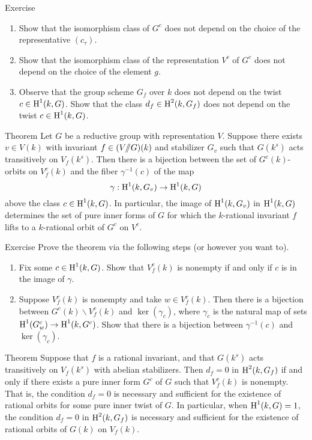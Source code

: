 \begin{enonce*}[remark]{Exercise}
\begin{enumerate}
  \item Show that the isomorphism class of $G^c$ does not depend on the choice 
    of the representative $(c_\tau)$. 
  \item Show that the isomorphism class of the representation $V^c$ of $G^c$ 
    does not depend on the choice of the element $g$. 
  \item Observe that the group scheme $G_f$ over $k$ does not depend on the 
    twist $c\in \operatorname{H}^1(k,G)$. Show that the class $d_f\in \operatorname{H}^2(k,G_f)$ does not 
    depend on the twist $c\in \operatorname{H}^1(k,G)$. 
\end{enumerate}
\end{enonce*}

\begin{enonce*}{Theorem}
Let $G$ be a reductive group with representation $V$. Suppose there exists 
$v\in V(k)$ with invariant $f\in (V/\!\!/ G)(k)$ and stabilizer $G_v$ such that 
$G(k^s)$ acts transitively on $V_f(k^s)$. Then there is a bijection between the 
set of $G^c(k)$-orbits on $V_f^c(k)$ and the fiber $\gamma^{-1}(c)$ of the map 
\[
  \gamma:\operatorname{H}^1(k,G_v) \to \operatorname{H}^1(k,G) 
\]
above the class $c\in \operatorname{H}^1(k,G)$. In particular, the image of $\operatorname{H}^1(k,G_v)$ in 
$\operatorname{H}^1(k,G)$ determines the set of pure inner forms of $G$ for which the 
$k$-rational invariant $f$ lifts to a $k$-rational orbit of $G^c$ on $V^c$. 
\end{enonce*}

\begin{enonce*}[remark]{Exercise}
Prove the theorem via the following steps (or however you want to). 
\begin{enumerate}
  \item Fix some $c\in \operatorname{H}^1(k,G)$. Show that $V_f^c(k)$ is nonempty if and only 
    if $c$ is in the image of $\gamma$. 
  \item Suppose $V_f^c(k)$ is nonempty and take $w\in V_f^c(k)$. Then there is a 
    bijection between $G^c(k)\backslash V_f^c(k)$ and $\ker(\gamma_c)$, where 
    $\gamma_c$ is the natural map of sets $\operatorname{H}^1(G_w^c)\to \operatorname{H}^1(k,G^c)$. Show 
    that there is a bijection between $\gamma^{-1}(c)$ and $\ker(\gamma_c)$. 
\end{enumerate}
\end{enonce*}

\begin{enonce*}{Theorem}
Suppose that $f$ is a rational invariant, and that $G(k^s)$ acts transitively 
on $V_f(k^s)$ with abelian stabilizers. Then $d_f=0$ in $\operatorname{H}^2(k,G_f)$ if and 
only if there exists a pure inner form $G^c$ of $G$ such that $V_f^c(k)$ is 
nonempty. That is, the condition $d_f=0$ is necessary and sufficient for the 
existence of rational orbits for some pure inner twist of $G$. In particular, 
when $\operatorname{H}^1(k,G)=1$, the condition $d_f=0$ in $\operatorname{H}^2(k,G_f)$ is necessary and 
sufficient for the existence of rational orbits of $G(k)$ on $V_f(k)$. 
\end{enonce*}

